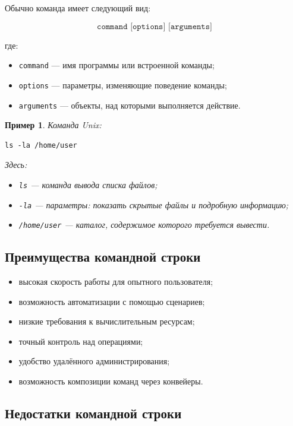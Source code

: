\documentclass[12pt,a4paper]{article}
\newtheorem{example}{Пример}
\begin{document}
Обычно команда имеет следующий вид:

\[
\texttt{command [options] [arguments]}
\]

где:
\begin{itemize}
    \item \texttt{command} --- имя программы или встроенной команды;
    \item \texttt{options} --- параметры, изменяющие поведение команды;
    \item \texttt{arguments} --- объекты, над которыми выполняется действие.
\end{itemize}

\begin{example}
Команда Unix:
\begin{lstlisting}
ls -la /home/user
\end{lstlisting}

Здесь:
\begin{itemize}
    \item \texttt{ls} --- команда вывода списка файлов;
    \item \texttt{-la} --- параметры: показать скрытые файлы и подробную информацию;
    \item \texttt{/home/user} --- каталог, содержимое которого требуется вывести.
\end{itemize}
\end{example}

\subsection{Преимущества командной строки}

\begin{itemize}
    \item высокая скорость работы для опытного пользователя;
    \item возможность автоматизации с помощью сценариев;
    \item низкие требования к вычислительным ресурсам;
    \item точный контроль над операциями;
    \item удобство удалённого администрирования;
    \item возможность композиции команд через конвейеры.
\end{itemize}

\subsection{Недостатки командной строки}
\end{document}
